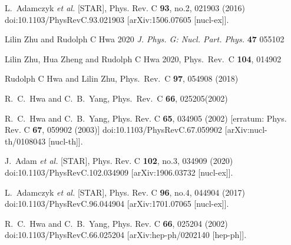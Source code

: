 \documentclass[twocolumn,aps,superscriptaddress,showpacs,nofootinbib,floatfix]{revtex4}
\begin{document}
\begin{thebibliography}{99}

L.~Adamczyk \textit{et al.} [STAR],
Phys. Rev. C \textbf{93}, no.2, 021903 (2016)
doi:10.1103/PhysRevC.93.021903
[arXiv:1506.07605 [nucl-ex]].

Lilin Zhu and Rudolph C Hwa 2020 {\it J. Phys. G: Nucl. Part. Phys.} {\bf 47} 055102

Lilin Zhu, Hua Zheng and Rudolph C Hwa 2020, Phys.\ Rev.\ C {\bf 104}, 014902 

Rudolph C Hwa and Lilin Zhu, Phys.\ Rev.\ C {\bf 97}, 054908 (2018)

R.~C.~Hwa and C.~B.~Yang, Phys.\ Rev.\ C {\bf 66}, 025205(2002)

R.~C.~Hwa and C.~B.~Yang,
Phys. Rev. C \textbf{65}, 034905 (2002)
[erratum: Phys. Rev. C \textbf{67}, 059902 (2003)]
doi:10.1103/PhysRevC.67.059902
[arXiv:nucl-th/0108043 [nucl-th]].

J.~Adam \textit{et al.} [STAR],
Phys. Rev. C \textbf{102}, no.3, 034909 (2020)
doi:10.1103/PhysRevC.102.034909
[arXiv:1906.03732 [nucl-ex]].

L.~Adamczyk \textit{et al.} [STAR],
Phys. Rev. C \textbf{96}, no.4, 044904 (2017)
doi:10.1103/PhysRevC.96.044904
[arXiv:1701.07065 [nucl-ex]].

R.~C.~Hwa and C.~B.~Yang,
Phys. Rev. C \textbf{66}, 025204 (2002)
doi:10.1103/PhysRevC.66.025204
[arXiv:hep-ph/0202140 [hep-ph]].


\end{thebibliography}
\end{document}
